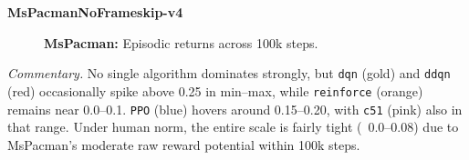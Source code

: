 \noindent
\textbf{MsPacmanNoFrameskip-v4}
\begin{figure}[htbp]
	\centering
	\quad
	\caption{\textbf{MsPacman:} Episodic returns across 100k steps.}
	\label{fig:mspacman_comparison_combined}
\end{figure}

\noindent
\emph{Commentary.}
No single algorithm dominates strongly, but \texttt{dqn} (gold) and \texttt{ddqn} (red) 
occasionally spike above 0.25 in min--max, while \texttt{reinforce} (orange) remains 
near 0.0--0.1. \texttt{PPO} (blue) hovers around 0.15--0.20, 
with \texttt{c51} (pink) also in that range. 
Under human norm, the entire scale is fairly tight (~0.0--0.08) 
due to MsPacman’s moderate raw reward potential within 100k steps.

\bigskip

